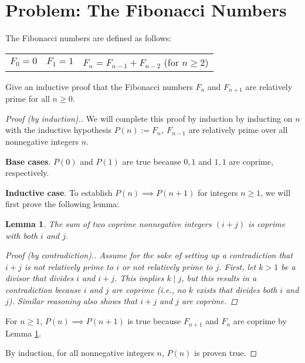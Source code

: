 \documentclass[a4paper]{article}
\newenvironment{subproof}[1][\proofname]{%
  \renewcommand{\qedsymbol}{$\blacksquare$}%
  \begin{proof}[#1]%
}{%
  \end{proof}%
}
\newtheorem{lemma}{Lemma}[section]
\begin{document}
\section{Problem: The Fibonacci Numbers}%
\label{sec:Problem: The Fibonacci Numbers}
	The Fibonacci numbers are defined as follows:

	\begin{table}[h!]
	\centering
	\begin{tabular}{c c c}
		$F_{0} = 0$ & $F_{1} = 1$ & $F_{n} = F_{n-1} + F_{n-2}$ (for $n \geq 2$)
	\end{tabular}
	\end{table}

	Give an inductive proof that the Fibonacci numbers $F_{n}$ and $F_{n+1}$ are
	relatively prime for all $n \geq 0$.

	\begin{proof}[Proof (by induction).]

		We will complete this proof by induction by inducting on $n$ with the
		inductive hypothesis $P(n) := F_{n},\ F_{n-1}$ are relatively prime
		over all nonnegative integers $n$.

		\textbf{Base cases}. $P(0)$ and $P(1)$ are true because $0, 1$ and $1, 1$ are coprime, respectively.

		\textbf{Inductive case}. To establish $P(n) \implies P(n+1)$ for integers
		$n \geq 1$, we will first prove the following lemma:

		\begin{lemma}
			\label{lem:coprime_sum}
			The sum of two coprime nonnegative integers $(i + j)$ is coprime with both $i$ and $j$.		

			\begin{subproof}[Proof (by contradiction).]

				Assume for the sake of setting up a contradiction that $i + j$ is not
				relatively prime to $i$ or not relatively prime to $j$. First, let $k >
				1$ be a divisor that divides $i$ and $i + j$. This implies $k \mid j$,
				but this results in a contradiction because $i$ and $j$ are coprime
				(i.e., no $k$ exists that divides both $i$ and $j$). Similar reasoning
				also shows that $i + j$ and $j$ are coprime.

			\end{subproof}

		\end{lemma}

		For $n \geq 1$, $P(n) \implies P(n+1)$ is true because $F_{n+1}$ and
		$F_{n}$ are coprime by Lemma \ref{lem:coprime_sum}.
			
		By induction, for all nonnegative integers $n$, $P(n)$ is proven true.

	\end{proof}
\end{document}
